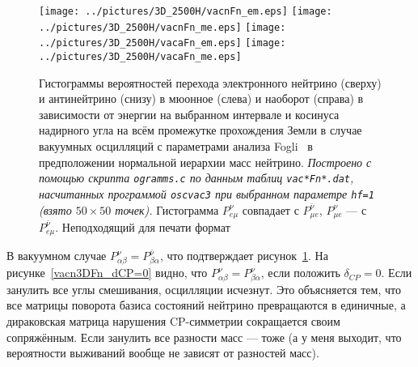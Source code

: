 \begin{figure}[!ht]
\texttt{[image: ../pictures/3D\_2500H/vacnFn\_em.eps]}
\texttt{[image: ../pictures/3D\_2500H/vacnFn\_me.eps]}
\texttt{[image: ../pictures/3D\_2500H/vacaFn\_em.eps]}
\texttt{[image: ../pictures/3D\_2500H/vacaFn\_me.eps]}
\caption{Гистограммы вероятностей перехода электронного нейтрино (сверху) и антинейтрино (снизу) в мюонное (слева) и наоборот (справа) в зависимости от энергии на выбранном интервале и косинуса надирного угла на всём промежутке прохождения Земли в случае вакуумных осцилляций с параметрами анализа Fogli~\cite{Fogli:2012ua} в предположении нормальной иерархии масс нейтрино. \textit{Построено с помощью скрипта \texttt{ogramms.c} по данным таблиц \texttt{vac*Fn*.dat}, насчитанных программой \texttt{oscvac3} при выбранном параметре \texttt{hf=1} (взято $50\times50$ точек).} Гистограмма $P^{\nu}_{e\mu}$ совпадает с $P^{\bar\nu}_{\mu{}e}$, $P^{\nu}_{\mu{}e}$ --- с $P^{\bar\nu}_{e\mu}$. {\color{magenta}Неподходящий для печати формат}}
\label{vac3DFn}
\end{figure}
\newpage
В вакуумном случае $P^{\nu}_{\alpha\beta}=P^{\bar\nu}_{\beta\alpha}$, что подтверждает рисунок~\ref{vac3DFn}. На рисунке~\ref{vacn3DFn_dCP=0} видно, что $P^{\nu}_{\alpha\beta}=P^{\nu}_{\beta\alpha}$, если положить $\delta_{CP}=0$. Если занулить все углы смешивания, осцилляции исчезнут. \textsf{Это объясняется тем, что все матрицы поворота базиса состояний нейтрино превращаются в единичные, а дираковская матрица нарушения CP-симметрии сокращается своим сопряжённым.} Если занулить {\color{red}все разности масс} --- тоже {\color{red}(а у меня выходит, что вероятности выживаний вообще не зависят от разностей масс)}.
\clearpage
